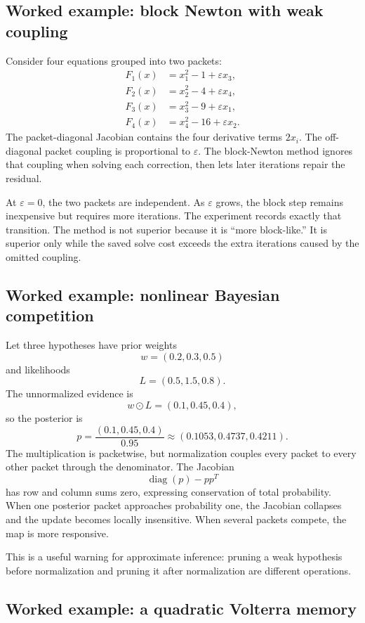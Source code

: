 \documentclass[11pt]{article}
\theoremstyle{definition}
\theoremstyle{remark}
\begin{document}
\subsection{Worked example: block Newton with weak coupling}

Consider four equations grouped into two packets:
\[
\begin{aligned}
F_1(x)&=x_1^2-1+\varepsilon x_3,\\
F_2(x)&=x_2^2-4+\varepsilon x_4,\\
F_3(x)&=x_3^2-9+\varepsilon x_1,\\
F_4(x)&=x_4^2-16+\varepsilon x_2.
\end{aligned}
\]
The packet-diagonal Jacobian contains the four derivative terms $2x_i$.  The off-diagonal packet coupling is proportional to $\varepsilon$.  The block-Newton method ignores that coupling when solving each correction, then lets later iterations repair the residual.

At $\varepsilon=0$, the two packets are independent.  As $\varepsilon$ grows, the block step remains inexpensive but requires more iterations.  The experiment records exactly that transition.  The method is not superior because it is ``more block-like.''  It is superior only while the saved solve cost exceeds the extra iterations caused by the omitted coupling.

\subsection{Worked example: nonlinear Bayesian competition}

Let three hypotheses have prior weights
\[
w=(0.2,0.3,0.5)
\]
and likelihoods
\[
L=(0.5,1.5,0.8).
\]
The unnormalized evidence is
\[
w\odot L=(0.1,0.45,0.4),
\]
so the posterior is
\[
p
=
\frac{(0.1,0.45,0.4)}{0.95}
\approx
(0.1053,0.4737,0.4211).
\]
The multiplication is packetwise, but normalization couples every packet to every other packet through the denominator.  The Jacobian
\[
\operatorname{diag}(p)-pp^T
\]
has row and column sums zero, expressing conservation of total probability.  When one posterior packet approaches probability one, the Jacobian collapses and the update becomes locally insensitive.  When several packets compete, the map is more responsive.

This is a useful warning for approximate inference: pruning a weak hypothesis before normalization and pruning it after normalization are different operations.

\subsection{Worked example: a quadratic Volterra memory}
\end{document}

